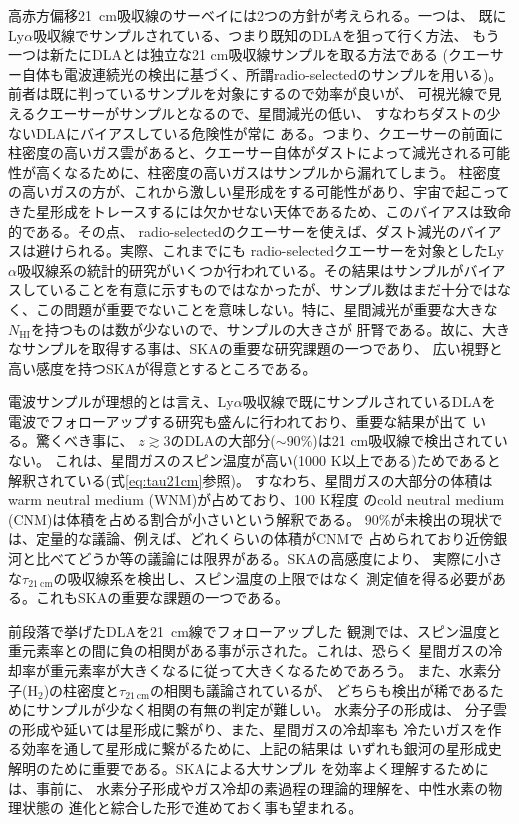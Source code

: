 高赤方偏移21~cm吸収線のサーベイには2つの方針が考えられる。一つは、
既にLy$\alpha$吸収線でサンプルされている、つまり既知のDLAを狙って行く方法、
もう一つは新たにDLAとは独立な21 cm吸収線サンプルを取る方法である
(クエーサー自体も電波連続光の検出に基づく、所謂radio-selectedのサンプルを用いる)。
前者は既に判っているサンプルを対象にするので効率が良いが、
可視光線で見えるクエーサーがサンプルとなるので、星間減光の低い、
すなわちダストの少ないDLAにバイアスしている危険性が常に
ある。つまり、クエーサーの前面に柱密度の高いガス雲があると、クエーサー自体がダストによって減光される可能性が高くなるために、柱密度の高いガスはサンプルから漏れてしまう\citep{2005A&A...444..461V}。
柱密度の高いガスの方が、これから激しい星形成をする可能性があり、宇宙で起こってきた星形成をトレースするには欠かせない天体であるため、このバイアスは致命的である。その点、
radio-selectedのクエーサーを使えば、ダスト減光のバイアスは避けられる。実際、これまでにも
radio-selectedクエーサーを対象としたLy$\alpha$吸収線系の統計的研究がいくつか行われている\citep{2005A&A...440..499A,2005AJ....130.1345E}。その結果はサンプルがバイアスしていることを有意に示すものではなかったが、サンプル数はまだ十分ではなく、この問題が重要でないことを意味しない。特に、星間減光が重要な大きな$N_\mathrm{HI}$を持つものは数が少ないので、サンプルの大きさが
肝腎である。故に、大きなサンプルを取得する事は、SKAの重要な研究課題の一つであり、
広い視野と高い感度を持つSKAが得意とするところである。

電波サンプルが理想的とは言え、Ly$\alpha$吸収線で既にサンプルされているDLAを
電波でフォローアップする研究も盛んに行われており、重要な結果が出て
いる\citep{2012MNRAS.421..651S,2014MNRAS.438.2131K}。驚くべき事に、
$z\gtrsim 3$のDLAの大部分($\sim 90$\%)は21 cm吸収線で検出されていない。
これは、星間ガスのスピン温度が高い(1000 K以上である)ためであると
解釈されている(式\ref{eq:tau21cm}参照)。
すなわち、星間ガスの大部分の体積はwarm neutral medium (WNM)が占めており、100 K程度
のcold neutral medium (CNM)は体積を占める割合が小さいという解釈である。
90\%が未検出の現状では、定量的な議論、例えば、どれくらいの体積がCNMで
占められており近傍銀河と比べてどうか等の議論には限界がある。SKAの高感度により、
実際に小さな$\tau_\mathrm{21~cm}$の吸収線系を検出し、スピン温度の上限ではなく
測定値を得る必要がある。これもSKAの重要な課題の一つである。

前段落で挙げたDLAを21~cm線でフォローアップした
観測\citep{2012MNRAS.421..651S,2014MNRAS.438.2131K}では、スピン温度と
重元素率との間に負の相関がある事が示された。これは、恐らく
星間ガスの冷却率が重元素率が大きくなるに従って大きくなるためであろう。
また、水素分子(H$_2$)の柱密度と$\tau_\mathrm{21\,cm}$の相関も議論されているが、
どちらも検出が稀であるためにサンプルが少なく相関の有無の判定が難しい。
水素分子の形成は、
分子雲の形成や延いては星形成に繋がり、また、星間ガスの冷却率も
冷たいガスを作る効率を通して星形成に繋がるために、上記の結果は
いずれも銀河の星形成史解明のために重要である。SKAによる大サンプル
を効率よく理解するためには、事前に、
水素分子形成やガス冷却の素過程の理論的理解を、中性水素の物理状態の
進化と綜合した形で進めておく事も望まれる。